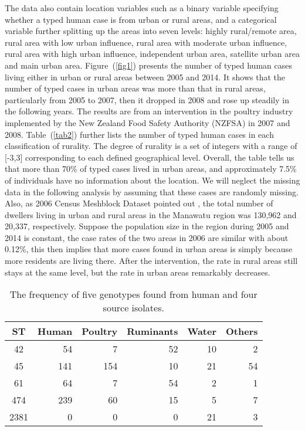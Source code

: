 \documentclass[times, doublespace]{WileyNJD-v2}%
\begin{document}
The data also contain location variables such as a binary variable specifying whether a typed human case is from urban or rural areas, and a categorical variable further splitting up the areas into seven levels: highly rural/remote area, rural area with low urban influence, rural area with moderate urban influence, rural area with high urban influence, independent urban area, satellite urban area and main urban area. Figure~(\ref{fig1}) presents the number of typed human cases living either in urban or rural areas between 2005 and 2014. It shows that the number of typed cases in urban areas was more than that in rural areas, particularly from 2005 to 2007, then it dropped in 2008 and rose up steadily in the following years. The results are from an intervention in the poultry industry implemented by the New Zealand Food Safety Authority (NZFSA) in 2007 and 2008. Table~(\ref{tab2}) further lists the number of typed human cases in each classification of rurality. The degree of rurality is a set of integers with a range of [-3,3] corresponding to each defined geographical level. Overall, the table tells us that more than 70\% of typed cases lived in urban areas, and approximately 7.5\% of individuals have no information about the location. We will neglect the missing data in the following analysis by assuming that these cases are randomly missing. Also, as 2006 Census Meshblock Dataset pointed out \cite{Stat}, the total number of dwellers living in urban and rural areas in the Manawatu region was 130,962 and 20,337, respectively. Suppose the population size in the region during 2005 and 2014 is constant, the case rates of the two areas in 2006 are similar with about 0.12\%, this then implies that more cases found in urban areas is simply because more residents are living there. After the intervention, the rate in rural areas still stays at the same level, but the rate in urban areas remarkably decreases. 


\begin{table}
  \begin{center}
    \begin{tabular}{crrrrr}
      \toprule
      ST & Human & Poultry & Ruminants & Water & Others\\ \midrule
      42 & 54 & 7 & 52 & 10 & 2\\
      45  & 141 & 154 & 10 & 21 & 54\\
      61 & 64 & 7 & 54 & 2 & 1\\
      474 & 239 & 60 & 15 & 5 & 7\\
      2381 & 0 & 0 & 0 & 21 & 3\\
      \bottomrule
    \end{tabular}
  \end{center}
  \caption{The frequency of five genotypes found from human and four source isolates.}
  \label{tab1}
\end{table}
\end{document}
